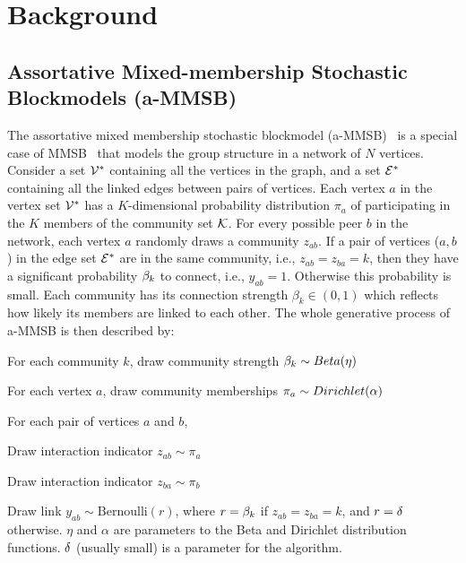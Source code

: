 \section{Background}

\subsection{Assortative Mixed-membership Stochastic Blockmodels (a-MMSB)}
The assortative mixed membership stochastic blockmodel (a-MMSB)~\cite{gopalan2012scalable} is a special case of MMSB~\cite{airoldi2009mixed} that models the group structure in a network of $N$ vertices. Consider a set  $\cV^*$ containing all the vertices in the graph, and a set $\cE^*$ containing all the linked edges between pairs of vertices. Each vertex $a$ in the vertex set $\cV^*$ has a $K$-dimensional probability distribution $\pi_a$ of participating in the $K$ members of the community set $\cK$.  For every possible peer $b$ in the network, each vertex $a$ randomly draws a community $z_{ab}$. If a pair of vertices ($a,b$) in the edge set $\cE^*$ are in the same community, i.e., $z_{ab}=z_{ba} = k$, then they have a significant probability $\beta_k$ to connect, i.e., $y_{ab}=1$. Otherwise this probability is small. Each community has its connection strength $\beta_{k} \in (0,1)$ which reflects how likely its members are linked to each other. The whole generative process of a-MMSB is then described by:
\benum
\item For each community $k$, draw community strength $\beta_k \sim \relax{Beta}(\eta)$
\item For each vertex $a$, draw community memberships $\pi_a \sim \relax{Dirichlet}(\alpha)$
\item For each pair of vertices $a$ and $b$,
\benum
	\item Draw interaction indicator $z_{ab} \sim \pi_a$
    \item Draw interaction indicator $z_{ba} \sim \pi_b$
    \item Draw link $y_{ab} \sim \mbox{Bernoulli}(r)$, where $r = \beta_k$ if $z_{ab}=z_{ba}=k$, and $r=\delta$ otherwise.
\eenum
\eenum
$\eta$ and $\alpha$ are parameters to the Beta and Dirichlet distribution functions. $\delta$ (usually small) is a parameter for the algorithm.

\newcommand{\Vertices}{\ensuremath{\cV^*{}}\xspace}
\newcommand{\Edges}{\ensuremath{\cE^*{}}\xspace}
\newcommand{\Heldout}{\ensuremath{\cE_h{}}\xspace}
\newcommand{\SGLDMinibatch}{\ensuremath{\cD_n{}}\xspace}
\newcommand{\Minibatch}{\ensuremath{\cE_n{}}\xspace}
\newcommand{\Minibatcht}{\ensuremath{\cE_{n_t}{}}\xspace}
\newcommand{\Neighbors}{\ensuremath{\cV_n{}}\xspace}


